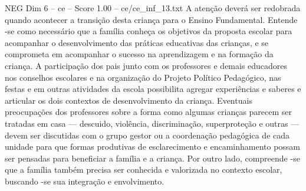 \begin{textsample}{NEG Dim 6 – ce – Score 1.00 – ce/ce\_inf\_13.txt}
A atenção deverá ser redobrada quando acontecer a transição desta criança para o Ensino Fundamental.
Entende -se como necessário que a família conheça os objetivos da proposta escolar para acompanhar o desenvolvimento das práticas educativas das crianças, e se comprometa em acompanhar o sucesso na aprendizagem e na formação da criança.
A participação dos pais junto com os professores e demais educadores nos conselhos escolares e na organização do Projeto Político Pedagógico, nas festas e em outras atividades da escola possibilita agregar experiências e saberes e articular os dois contextos de desenvolvimento da criança.
Eventuais preocupações dos professores sobre a forma como algumas crianças parecem ser tratadas em casa — descuido, violência, discriminação, superproteção e outras — devem ser discutidas com o grupo gestor ou a coordenação pedagógica de cada unidade para que formas produtivas de esclarecimento e encaminhamento possam ser pensadas para beneficiar a família e a criança.
Por outro lado, compreende -se que a família também precisa ser conhecida e valorizada no contexto escolar, buscando -se sua integração e envolvimento.

\end{textsample}
